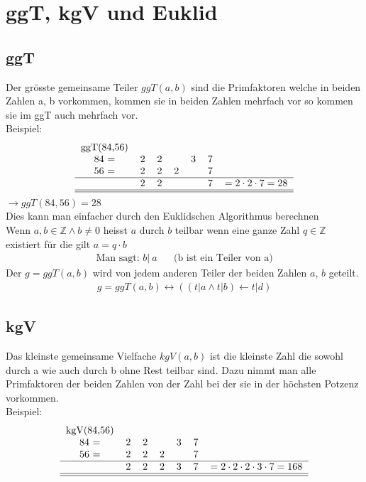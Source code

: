\documentclass[a4paper]{scrartcl}
\begin{document}
\section{ggT, kgV und Euklid}
\subsection{ggT}
Der grösste gemeinsame Teiler $ggT(a,b)$ sind die Primfaktoren welche in beiden Zahlen a, b vorkommen, kommen sie in beiden Zahlen mehrfach vor so kommen sie im ggT auch mehrfach vor. \\
Beispiel: \\
\begin{align}
\begin{tabular}{c c c c c c c c }
ggT(84,56) \\
84 =&2&2& &3&7 \\
56 =&2&2&2&&7 \\
\hline 
&2&2&&&7&$= 2 \cdot 2 \cdot 7= 28$ \\
\hline \hline
\end{tabular}
\end{align}
$ \rightarrow ggT(84,56)=28$ \\
\newline
Dies kann man einfacher durch den Euklidschen Algorithmus berechnen \\
Wenn $a, b \in \mathbb{Z} \wedge b \neq 0$ heisst $a$ durch $b$ teilbar wenn eine ganze Zahl $q \in \mathbb{Z}$ existiert für die gilt $a=q \cdot b$ \\
\begin{align}
\text{Man sagt: }b| \ a \hspace{20pt} \text{(b ist ein Teiler von a)}
\end{align}
Der $g=ggT(a,b)$ wird von jedem anderen Teiler der beiden Zahlen $a$, $b$ geteilt. \\
\begin{align}
g=ggT(a,b) \leftrightarrow ((t |a \wedge t |b) \leftarrow t |d)
\end{align}

\subsection{kgV}
Das kleinste gemeinsame Vielfache $kgV(a,b)$ ist die kleinste Zahl die sowohl durch a wie auch durch b ohne Rest teilbar sind. Dazu nimmt man alle Primfaktoren der beiden Zahlen von der Zahl bei der sie in der höchsten Potzenz vorkommen. \\
Beispiel: \\
\begin{align}
\begin{tabular}{c c c c c c c c }
kgV(84,56) \\
84 =&2&2& &3&7 \\
56 =&2&2&2&&7 \\
\hline 
&2&2&2&3&7&$= 2 \cdot 2\cdot 2\cdot 3 \cdot 7= 168$ \\
\hline \hline
\end{tabular}
\end{align}
\end{document}
